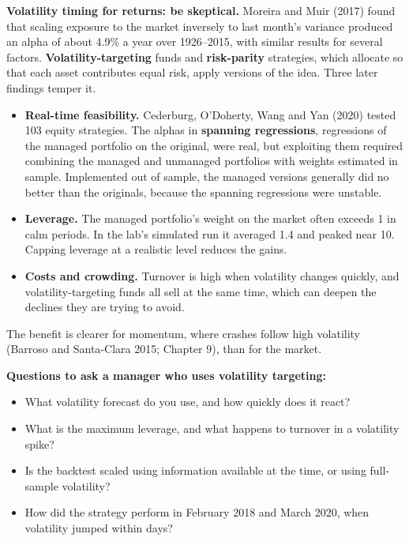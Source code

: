 \textbf{Volatility timing for returns: be skeptical.} Moreira and Muir (2017) found that scaling exposure to the market inversely to last month's variance produced an alpha of about 4.9\% a year over 1926--2015, with similar results for several factors. \textbf{Volatility-targeting} funds and \textbf{risk-parity} strategies, which allocate so that each asset contributes equal risk, apply versions of the idea. Three later findings temper it.

\begin{itemize}
  \item \textbf{Real-time feasibility.} Cederburg, O'Doherty, Wang and Yan (2020) tested 103 equity strategies. The alphas in \textbf{spanning regressions}, regressions of the managed portfolio on the original, were real, but exploiting them required combining the managed and unmanaged portfolios with weights estimated in sample. Implemented out of sample, the managed versions generally did no better than the originals, because the spanning regressions were unstable.
  \item \textbf{Leverage.} The managed portfolio's weight on the market often exceeds 1 in calm periods. In the lab's simulated run it averaged 1.4 and peaked near 10. Capping leverage at a realistic level reduces the gains.
  \item \textbf{Costs and crowding.} Turnover is high when volatility changes quickly, and volatility-targeting funds all sell at the same time, which can deepen the declines they are trying to avoid.
\end{itemize}

The benefit is clearer for momentum, where crashes follow high volatility (Barroso and Santa-Clara 2015; Chapter 9), than for the market.

\textbf{Questions to ask a manager who uses volatility targeting:}

\begin{itemize}
  \item What volatility forecast do you use, and how quickly does it react?
  \item What is the maximum leverage, and what happens to turnover in a volatility spike?
  \item Is the backtest scaled using information available at the time, or using full-sample volatility?
  \item How did the strategy perform in February 2018 and March 2020, when volatility jumped within days?
\end{itemize}

